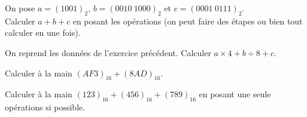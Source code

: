\documentclass[a4paper,12pt,french]{book}
\begin{document}
\begin{exercice}[]
	On pose  $a=(1001)_2$, $b=(0010\ 1000)_2$ et $c=(0001\ 0111)_2$.\\

Calculer $a +b+c$ en posant les opérations (on peut faire des étapes ou bien tout calculer en une fois).

\end{exercice}

\begin{exercice}[]
	On reprend les données de l'exercice précédent.	Calculer $a\times 4+b\div 8 +c$.
\end{exercice}

\begin{exercice}[]
	Calculer à la main $(AF3)_{16}+(8AD)_{16}$.
\end{exercice}

\begin{exercice}[]
	Calculer à la main $(123)_{16}+(456)_{16}+(789)_{16}$ en posant une seule opérations si possible.
\end{exercice}
\end{document}
